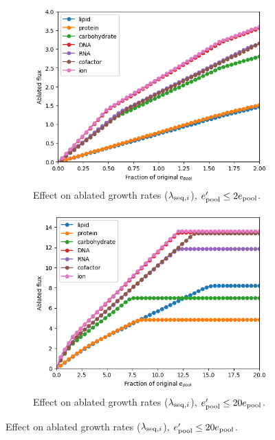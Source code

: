 \begin{figure}
  \begin{subfigure}[htpb]{0.45\textwidth}
   \centering
   \includegraphics[width=\textwidth]{epool_ec_components}
   \caption{
     Effect on ablated growth rates ($\lambda_{\mathrm{seq},i}$), $e_{\mathrm{pool}}^{\prime} \leq 2e_{\mathrm{pool}}$.
   }
   \label{fig:model-pool-ablated}
  \end{subfigure}%
  \begin{subfigure}[htpb]{0.45\textwidth}
   \centering
   \includegraphics[width=\textwidth]{epool_ec_components_20}
   \caption{
     Effect on ablated growth rates ($\lambda_{\mathrm{seq},i}$), $e_{\mathrm{pool}}^{\prime} \leq 20e_{\mathrm{pool}}$.
   }
   \label{fig:model-pool-ablated-20}
  \end{subfigure}


\end{figure}
